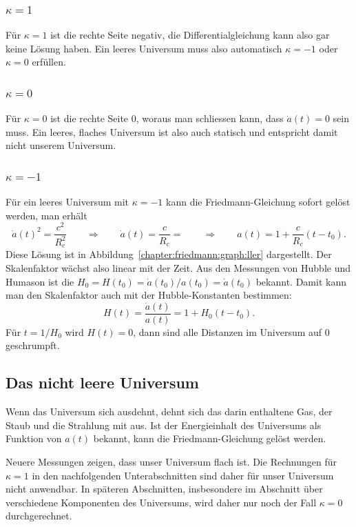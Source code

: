 \subsubsection{$\kappa=1$}
Für $\kappa=1$ ist die rechte Seite negativ, die Differentialgleichung
kann also gar keine Lösung haben.
Ein leeres Universum muss also automatisch $\kappa=-1$ oder $\kappa=0$
erfüllen.

\subsubsection{$\kappa=0$}
Für $\kappa=0$ ist die rechte Seite $0$, woraus man schliessen kann,
dass $\dot a(t)=0$ sein muss.
Ein leeres, flaches Universum ist also auch statisch und entspricht
damit nicht unserem Universum.

\subsubsection{$\kappa=-1$}
Für ein leeres Universum mit $\kappa=-1$ kann die Friedmann-Gleichung sofort
gelöst werden, man erhält
\[
\dot a(t)^2
=
\frac{c^2}{R_c^2}
\qquad\Rightarrow\qquad
\dot a(t) = \frac{c}{R_c} = 
\qquad\Rightarrow\qquad
a(t)= 1 + \frac{c}{R_c}(t-t_0).
\]
Diese Lösung ist in Abbildung~\ref{chapter:friedmann:graph:ller} dargestellt.
Der Skalenfaktor wächst also linear mit der Zeit.
Aus den Messungen von Hubble und Humason ist die
$H_0=H(t_0)=\dot a(t_0)/a(t_0)=\dot a(t_0)$
bekannt.
Damit kann man den Skalenfaktor auch mit der Hubble-Konstanten
bestimmen:
\[
H(t) =  \frac{\dot a(t)}{a(t)} = 1 + H_0(t-t_0).
\]
Für $t=1/H_0$ wird $H(t)=0$, dann sind alle Distanzen im
Universum auf $0$ geschrumpft.


\subsection{Das nicht leere Universum}
Wenn das Universum sich ausdehnt, dehnt sich das darin enthaltene
Gas, der Staub und die Strahlung mit aus.
Ist der Energieinhalt des Universums als Funktion von $a(t)$ bekannt,
kann die Friedmann-Gleichung gelöst werden.

Neuere Messungen zeigen, dass unser Universum flach ist.
Die Rechnungen für $\kappa=1$ in den nachfolgenden Unterabschnitten
sind daher für unser Universum nicht anwendbar.
In späteren Abschnitten, insbesondere im Abschnitt über verschiedene
Komponenten des Universums, wird daher nur noch der Fall $\kappa=0$
durchgerechnet.

